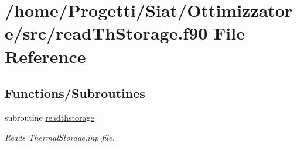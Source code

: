 \hypertarget{read_th_storage_8f90}{\section{/home/\-Progetti/\-Siat/\-Ottimizzatore/src/read\-Th\-Storage.f90 File Reference}
\label{read_th_storage_8f90}
}
\subsection*{Functions/\-Subroutines}
\begin{DoxyCompactItemize}
\item 
subroutine \hyperlink{read_th_storage_8f90_aa12da0418968e1e7388fbadb2e807303}{readthstorage}
\begin{DoxyCompactList}\small\item\em Reads Thermal\-Storage.\-inp file. \end{DoxyCompactList}\end{DoxyCompactItemize}


